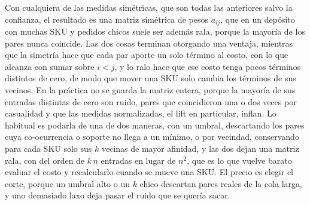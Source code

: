 Con cualquiera de las medidas simétricas, que son todas las anteriores salvo la confianza, el resultado es una matriz simétrica de pesos $a_{ij}$, que en un depósito con muchas SKU y pedidos chicos suele ser además rala, porque la mayoría de los pares nunca coincide.
Las dos cosas terminan otorgando una ventaja, mientras que la simetría hace que cada par aporte un solo término al costo, con lo que alcanza con sumar sobre $i < j$, y lo ralo hace que ese costo tenga pocos términos distintos de cero, de modo que mover una SKU solo cambia los términos de sus vecinos.
En la práctica no se guarda la matriz entera, porque la mayoría de sus entradas distintas de cero son ruido, pares que coincidieron una o dos veces por casualidad y que las medidas normalizadas, el lift en particular, inflan.
Lo habitual es podarla de una de dos maneras, con un umbral, descartando los pares cuya co-ocurrencia o soporte no llega a un mínimo, o por vecindad, conservando para cada SKU solo sus $k$ vecinas de mayor afinidad, y las dos dejan una matriz rala, con del orden de $k\,n$ entradas en lugar de $n^2$, que es lo que vuelve barato evaluar el costo y recalcularlo cuando se mueve una SKU.
El precio es elegir el corte, porque un umbral alto o un $k$ chico descartan pares reales de la cola larga, y uno demasiado laxo deja pasar el ruido que se quería sacar.


\FloatBarrier
